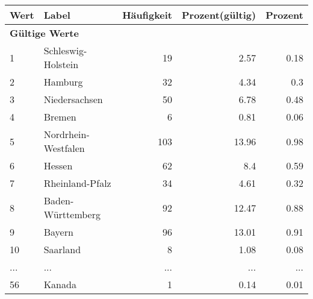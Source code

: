      \begin{longtable}{lXrrr}
     \toprule
     \textbf{Wert} & \textbf{Label} & \textbf{Häufigkeit} & \textbf{Prozent(gültig)} & \textbf{Prozent} \\
     \endhead
     \midrule
     \multicolumn{5}{l}{\textbf{Gültige Werte}}\\
        1 & \multicolumn{1}{X}{Schleswig-Holstein} & %
          \num{19} &
          \num[round-mode=places,round-precision=2]{2.57} &
          \num[round-mode=places,round-precision=2]{0.18} \\
        2 & \multicolumn{1}{X}{Hamburg} & %
          \num{32} &
          \num[round-mode=places,round-precision=2]{4.34} &
          \num[round-mode=places,round-precision=2]{0.3} \\
        3 & \multicolumn{1}{X}{Niedersachsen} & %
          \num{50} &
          \num[round-mode=places,round-precision=2]{6.78} &
          \num[round-mode=places,round-precision=2]{0.48} \\
        4 & \multicolumn{1}{X}{Bremen} & %
          \num{6} &
          \num[round-mode=places,round-precision=2]{0.81} &
          \num[round-mode=places,round-precision=2]{0.06} \\
        5 & \multicolumn{1}{X}{Nordrhein-Westfalen} & %
          \num{103} &
          \num[round-mode=places,round-precision=2]{13.96} &
          \num[round-mode=places,round-precision=2]{0.98} \\
        6 & \multicolumn{1}{X}{Hessen} & %
          \num{62} &
          \num[round-mode=places,round-precision=2]{8.4} &
          \num[round-mode=places,round-precision=2]{0.59} \\
        7 & \multicolumn{1}{X}{Rheinland-Pfalz} & %
          \num{34} &
          \num[round-mode=places,round-precision=2]{4.61} &
          \num[round-mode=places,round-precision=2]{0.32} \\
        8 & \multicolumn{1}{X}{Baden-Württemberg} & %
          \num{92} &
          \num[round-mode=places,round-precision=2]{12.47} &
          \num[round-mode=places,round-precision=2]{0.88} \\
        9 & \multicolumn{1}{X}{Bayern} & %
          \num{96} &
          \num[round-mode=places,round-precision=2]{13.01} &
          \num[round-mode=places,round-precision=2]{0.91} \\
        10 & \multicolumn{1}{X}{Saarland} & %
          \num{8} &
          \num[round-mode=places,round-precision=2]{1.08} &
          \num[round-mode=places,round-precision=2]{0.08} \\
       ... & ... & ... & ... & ... \\
        56 & \multicolumn{1}{X}{Kanada} & %
          \num{1} &
          \num[round-mode=places,round-precision=2]{0.14} &
          \num[round-mode=places,round-precision=2]{0.01} \\


\end{longtable}
